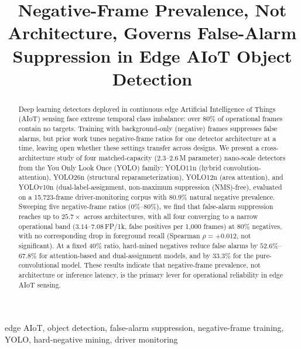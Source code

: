 \documentclass[conference]{IEEEtran}
\begin{document}
\title{Negative-Frame Prevalence, Not Architecture, Governs
       False-Alarm Suppression in Edge AIoT Object Detection}

\author{
}

\maketitle

\begin{abstract}
Deep learning detectors deployed in continuous edge Artificial
Intelligence of Things (AIoT) sensing face extreme temporal class
imbalance: over 80\% of operational frames contain no targets.
Training with background-only (negative) frames suppresses false
alarms, but prior work tunes negative-frame ratios for one detector
architecture at a time, leaving open whether these settings transfer
across designs.
We present a cross-architecture study of four matched-capacity
($2.3$--$2.6$\,M parameter) nano-scale detectors from the You Only
Look Once (YOLO) family: YOLO11n (hybrid convolution-attention),
YOLO26n (structural reparameterization), YOLO12n (area attention),
and YOLOv10n (dual-label-assignment, non-maximum suppression (NMS)-free),
evaluated on a 15,723-frame driver-monitoring corpus with 80.9\%
natural negative prevalence.
Sweeping five negative-frame ratios (0\%--80\%), we find that
false-alarm suppression reaches up to $25.7\times$
across architectures, with all four converging
to a narrow operational band ($3.14$--$7.08$\,FP/1k, false positives
per 1,000 frames) at 80\% negatives, with no corresponding drop in
foreground recall (Spearman $\rho = +0.012$, not significant).
At a fixed 40\% ratio, hard-mined negatives reduce false alarms by
$52.6\%$--$67.8\%$ for attention-based and dual-assignment models,
and by $33.3\%$ for the pure-convolutional model.
These results indicate that negative-frame prevalence, not
architecture or inference latency, is the primary lever for
operational reliability in edge AIoT sensing.
\end{abstract}

\begin{IEEEkeywords}
edge AIoT, object detection, false-alarm suppression, negative-frame
training, YOLO, hard-negative mining, driver monitoring
\end{IEEEkeywords}
\end{document}
